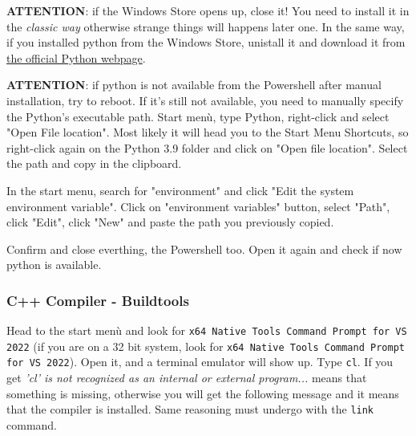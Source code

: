 \begin{warning}
\textbf{ATTENTION}: if the Windows Store opens up, close it! You need to install it in the \textit{classic way} otherwise strange things will happens later one. In the same way, if you installed python from the Windows Store, unistall it and download it from \href{https://www.python.org/downloads/release/python-390/}{the official Python webpage}.
\end{warning}

\newpage
\begin{warning}
\textbf{ATTENTION}: if python is not available from the Powershell after manual installation, try to reboot. If it's still not available, you need to manually specify the Python's executable path. Start menù, type Python, right-click and select "Open File location". Most likely it will head you to the Start Menu Shortcuts, so right-click again on the Python 3.9 folder and click on "Open file location". Select the path and copy in the clipboard. 

In the start menu, search for "environment" and click "Edit the system environment variable". Click on "environment variables" button, select "Path", click "Edit", click "New" and paste the path you previously copied.

Confirm and close everthing, the Powershell too. Open it again and check if now python is available. 
\end{warning}

\subsubsection{C++ Compiler - Buildtools}
Head to the start menù and look for \texttt{x64 Native Tools Command Prompt for VS 2022} (if you are on a 32 bit system, look for \texttt{x64 Native Tools Command Prompt for VS 2022}). Open it, and a terminal emulator will show up. Type \texttt{cl}. If you get \textit{'cl' is not recognized as an internal or external program...} means that something is missing, otherwise you will get the following message and it means that the compiler is installed. Same reasoning must undergo with the \texttt{link} command.

